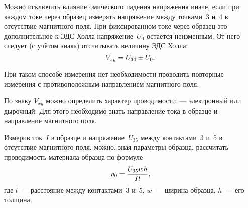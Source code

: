 Можно исключить влияние омического падения напряжения иначе, если при каждом
токе через образец измерять напряжение
между точками~3 и~4 в отсутствие магнитного поля. При фиксированном токе через
образец это дополнительное к ЭДС Холла напряжение~$U_0$ остаётся неизменным. От
него следует (с учётом знака) отсчитывать величину ЭДС Холла:
\begin{equation}
	V_{xy} = U_{34}\pm U_0.
	\eqmark{3.4.1}
\end{equation}

При таком способе измерения нет необходимости проводить повторные измерения
с противоположным направлением магнитного поля.

По знаку $V_{xy}$ можно определить характер проводимости~--- электронный или
дырочный. Для этого необходимо знать направление тока в образце и направление
магнитного поля.

Измерив ток~$I$ в образце и напряжение~$U_{35}$ между контактами~3 и~5 в
отсутствие магнитного поля, можно, зная
параметры образца, рассчитать проводимость материала образца по формуле
\begin{equation}
	\rho_0=\frac{U_{35}wh}{Il},
	\eqmark{3.4.2}
\end{equation}
где $l$~--- расстояние между контактами~3 и~5, $w$~--- ширина образца, $h$~---
его толщина.

